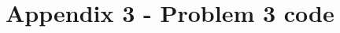 \documentclass[a4paper,12pt]{article}
\begin{document}
\section{Appendix 3 - Problem 3 code}






\end{document}

